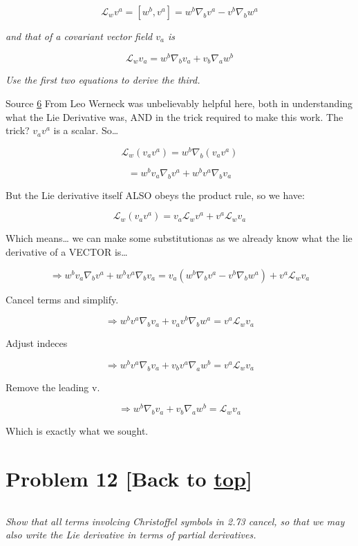\documentclass[landscape,letterpaper,10pt,english]{article}
\begin{document}
\[ \mathcal{L}_w v^a = [w^b,v^a] = w^b \nabla_b v^a - v^b \nabla_b w^a \]

\emph{and that of a covariant vector field \(v_a\) is}

\[ \mathcal{L}_w v_a = w^b \nabla_b v_a + v_b \nabla_a w^b \]

\emph{Use the first two equations to derive the third.}

    Source \hyperref[6]{6} From Leo Werneck was unbelievably helpful here,
both in understanding what the Lie Derivative was, AND in the trick
required to make this work. The trick? \(v_av^a\) is a scalar.
So\ldots{}

\[ \mathcal{L}_w (v_av^a) = w^b \nabla_b (v_av^a) \]

\[ = w^b v_a \nabla_b v^a + w^b v^a \nabla_b v_a \]

But the Lie derivative itself ALSO obeys the product rule, so we have:

\[ \mathcal{L}_w (v_av^a) = v_a \mathcal{L}_w v^a + v^a \mathcal{L}_w v_a \]

    Which means\ldots{} we can make some substitutionas as we already know
what the lie derivative of a VECTOR is\ldots{}

\[ \Rightarrow w^b v_a \nabla_b v^a + w^b v^a \nabla_b v_a = v_a (w^b \nabla_b v^a - v^b \nabla_b w^a) + v^a \mathcal{L}_w v_a \]

    Cancel terms and simplify.

\[ \Rightarrow w^b v^a \nabla_b v_a + v_a v^b \nabla_b w^a = v^a \mathcal{L}_w v_a \]

Adjust indeces

\[ \Rightarrow w^b v^a \nabla_b v_a + v_b v^a \nabla_a w^b = v^a \mathcal{L}_w v_a \]

Remove the leading v.

\[ \Rightarrow w^b \nabla_b v_a + v_b \nabla_a w^b = \mathcal{L}_w v_a \]

Which is exactly what we sought.

    \hypertarget{problem-12-back-to-top}{%
\section{\texorpdfstring{Problem 12 {[}Back to
\hyperref[toc]{top}{]}}{Problem 12 {[}Back to {]}}}\label{problem-12-back-to-top}}

\[\label{P12}\]

\emph{Show that all terms involcing Christoffel symbols in 2.73 cancel,
so that we may also write the Lie derivative in terms of partial
derivatives.}
\end{document}
